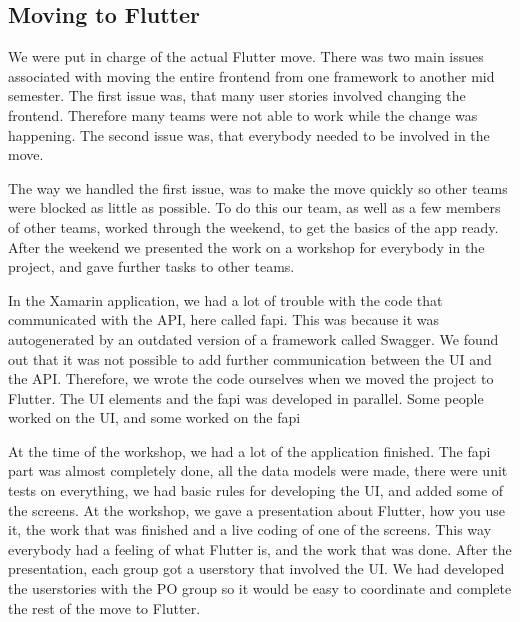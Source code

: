 \subsection{Moving to Flutter} \label{sec:moving-to-flutter}
We were put in charge of the actual Flutter move.
There was two main issues associated with moving the entire frontend from one framework to another mid semester.
The first issue was, that many user stories involved changing the frontend. Therefore many teams were not able to work while the change was happening.
The second issue was, that everybody needed to be involved in the move.

The way we handled the first issue, was to make the move quickly so other teams were blocked as little as possible.
To do this our team, as well as a few members of other teams, worked through the weekend, to get the basics of the app ready. After the weekend we presented the work on a workshop for everybody in the project, and gave further tasks to other teams.

In the Xamarin application, we had a lot of trouble with the code that communicated with the API, here called \gls{fapi}. This was because it was autogenerated by an outdated version of a framework called Swagger. We found out that it was not possible to add further communication between the UI and the API. Therefore, we wrote the code ourselves when we moved the project to Flutter. The UI elements and the \gls{fapi} was developed in parallel. Some people worked on the UI, and some worked on the \gls{fapi}

At the time of the workshop, we had a lot of the application finished. The \gls{fapi} part was almost completely done, all the data models were made, there were unit tests on everything, we had basic rules for developing the UI, and added some of the screens.
At the workshop, we gave a presentation about Flutter, how you use it, the work that was finished and a live coding of one of the screens. This way everybody had a feeling of what Flutter is, and the work that was done.
After the presentation, each group got a userstory that involved the UI. We had developed the userstories with the \gls{PO} group so it would be easy to coordinate and complete the rest of the move to Flutter.